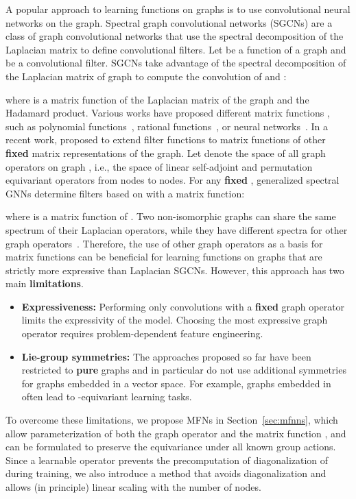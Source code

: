 \documentclass{article} \usepackage{iclr2024_conference,times}
\begin{document}
A popular approach to learning functions on graphs is to use convolutional neural networks on the graph.
Spectral graph convolutional networks (SGCNs)  are a class of graph convolutional networks that use the spectral decomposition of the Laplacian matrix to define convolutional filters.
Let  be a function of a graph  and  be a convolutional filter. 
SGCNs take advantage of the spectral decomposition of the Laplacian matrix of graph  to compute the convolution of  and : 

where  is a matrix function of the Laplacian matrix  of the graph  and  the Hadamard product. 
Various works have proposed different matrix functions , such as polynomial functions~\citep{ChebyConv}, rational functions~\citep{ARMA}, or neural networks~\citep{WUGNN2021}.
In a recent work, \cite{yang2023better} proposed to extend filter functions to matrix functions of other \textbf{fixed} matrix representations of the graph.
Let  denote the space of all graph operators on graph , i.e., the space of linear self-adjoint and permutation equivariant operators from nodes to nodes.
For any \textbf{fixed} , generalized spectral GNNs determine filters based on   with a matrix function:

where  is a matrix function of . 
Two non-isomorphic graphs can share the same spectrum of their Laplacian operators, while they have different spectra for other graph operators~\citep{JOHNSON198096}.
Therefore, the use of other graph operators as a basis for matrix functions can be beneficial for learning functions on graphs that are strictly more expressive than Laplacian SGCNs.
However, this approach has two main \textbf{limitations}.
\begin{itemize}
    \item \textbf{Expressiveness:} Performing only convolutions with a \textbf{fixed} graph operator  limits the expressivity of the model. Choosing the most expressive graph operator requires problem-dependent feature engineering.
    \item \textbf{Lie-group symmetries:} The approaches proposed so far have been restricted to \textbf{pure} graphs and in particular do not use additional symmetries for graphs embedded in a vector space. For example, graphs embedded in  often lead to -equivariant learning tasks.
\end{itemize}

To overcome these limitations, we propose MFNs in Section~\ref{sec:mfnns}, 
which allow parameterization of both the graph operator  and the matrix function , and can be formulated to preserve the equivariance under all known group actions. Since a learnable operator  prevents the precomputation of diagonalization of  during training, we also introduce a method that avoids diagonalization and allows (in principle) linear scaling with the number of nodes.  
\end{document}
